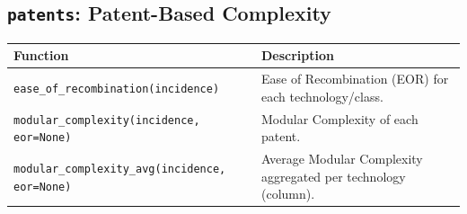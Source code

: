 \subsection{\texttt{patents}: Patent-Based Complexity}
\begin{longtable}{>{\raggedright\arraybackslash}p{9.2cm} >{\raggedright\arraybackslash}p{7.0cm}}
\toprule
\textbf{Function} & \textbf{Description} \\
\midrule\endhead
\texttt{\footnotesize ease\_of\_recombination(incidence)} & {\small Ease of Recombination (EOR) for each technology/class.} \\[2pt]
\texttt{\footnotesize modular\_complexity(incidence, eor=None)} & {\small Modular Complexity of each patent.} \\[2pt]
\texttt{\footnotesize modular\_complexity\_avg(incidence, eor=None)} & {\small Average Modular Complexity aggregated per technology (column).} \\[2pt]
\bottomrule
\end{longtable}


